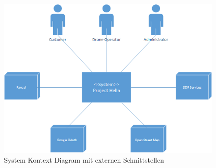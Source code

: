 \begin{figure}[h]
\includegraphics[width=1.0\textwidth]{images/system-context-diagram.png}
\caption{System Kontext Diagram mit externen Schnittstellen }
\label{fig:system-context-diagram}
\end{figure}




